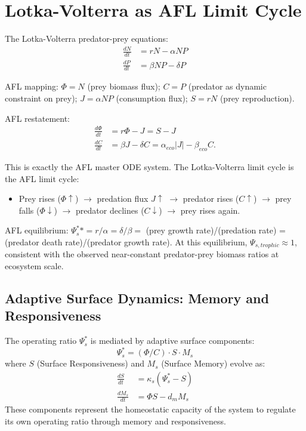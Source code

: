\documentclass[11pt]{article}
\begin{document}
\section{Lotka-Volterra as AFL Limit Cycle}

The Lotka-Volterra predator-prey equations:
\begin{align}
\frac{dN}{dt} &= rN - \alpha NP \\
\frac{dP}{dt} &= \beta NP - \delta P
\end{align}

AFL mapping: $\Phi = N$ (prey biomass flux); $C = P$ (predator as dynamic constraint on prey);
$J = \alpha NP$ (consumption flux); $S = rN$ (prey reproduction).

AFL restatement:
\begin{align}
\frac{d\Phi}{dt} &= r\Phi - J = S - J \\
\frac{dC}{dt} &= \beta J - \delta C = \alpha_{eco}|J| - \beta_{eco} C.
\end{align}

This is exactly the AFL master ODE system. The Lotka-Volterra limit cycle is the AFL limit cycle:
\begin{itemize}
    \item Prey rises ($\Phi \uparrow$) $\to$ predation flux $J \uparrow$ $\to$ predator rises
          ($C \uparrow$) $\to$ prey falls ($\Phi \downarrow$) $\to$ predator declines ($C
          \downarrow$) $\to$ prey rises again.
\end{itemize}

AFL equilibrium: $\Psi_s^** = r/\alpha = \delta/\beta = $ (prey growth rate)/(predation rate) =
(predator death rate)/(predator growth rate). At this equilibrium, $\Psi_{s,trophic} \approx 1$,
consistent with the observed near-constant predator-prey biomass ratios at ecosystem scale.

\subsection{Adaptive Surface Dynamics: Memory and Responsiveness}

The operating ratio $\Psi_s^*$ is mediated by adaptive surface components:
\begin{equation}
\Psi_s^* = (\Phi/C) \cdot S \cdot M_s
\end{equation}
where $S$ (Surface Responsiveness) and $M_s$ (Surface Memory) evolve as:
\begin{align}
\frac{dS}{dt} &= \kappa_s (\Psi_s^* - S) \\
\frac{dM_s}{dt} &= \Phi S - d_m M_s
\end{align}
These components represent the homeostatic capacity of the system to regulate its own operating ratio through memory and responsiveness.
\end{document}
